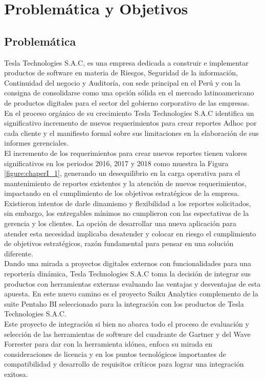 \chapter{Problemática y Objetivos} \label{chapter:I}
\section{Problem\'{a}tica}
\begin{spacing}{1.5}	
	Tesla Technologies S.A.C, es una empresa dedicada a construir e implementar productos de software en materia de Riesgos, Seguridad de la información, Continuidad del negocio y Auditoría, con sede principal en el Perú y con la consigna de consolidarse como una opci\'{o}n s\'{o}lida en el mercado latinoamericano de productos digitales para el sector del gobierno corporativo de las empresas.\\	                         
	En el proceso org\'{a}nico de su crecimiento Tesla Technologies S.A.C  identifica un significativo incremento de nuevos requerimientos para crear reportes Adhoc por cada cliente y el manifiesto formal sobre sus limitaciones en la elaboraci\'{o}n de sus informes gerenciales.\\
	El incremento de los requerimientos para crear nuevos reportes tienen valores significativos en los periodos 2016, 2017 y 2018 como muestra la Figura \ref{figure:chaperI_1}, generando un desequilibrio en la carga operativa para el mantenimiento de reportes existentes y la atenci\'{o}n de nuevos requerimientos, impactando en el cumplimiento de los objetivos estrat\'{e}gicos de la empresa.\\
	Existieron intentos de darle dinamismo y flexibilidad a los reportes solicitados, sin embargo,  los entregables m\'{i}nimos no cumplieron con las espectativas de la gerencia y los clientes. La opci\'{o}n de desarrollar una nueva aplicaci\'{o}n para atender esta necesidad implicaba desatender y colocar en riesgo el cumplimiento de objetivos estrat\'{e}gicos, raz\'{o}n fundamental para pensar en una soluci\'{o}n diferente.\\
	Dando una mirada a proyectos digitales externos con funcionalidades para una reporter\'{i}a din\'{a}mica, Tesla Technologies S.A.C toma la decisi\'{o}n de integrar sus productos con herramientas externas evaluando las ventajas y desventajas de esta apuesta. En este nuevo camino es el proyecto Saiku Analytics complemento de la suite Pentaho BI seleccionado para la integración con los productos de Tesla Technologies S.A.C.\\	
	Este proyecto de integraci\'{o}n si bien no abarca todo el proceso de evaluaci\'{o}n y selecci\'{o}n de  las herramientas de software del cuadrante de Gartner y del Wave Forrester para dar con la herramienta id\'{o}nea, enfoca su mirada en consideraciones de licencia y en los puntos tecnol\'{o}gicos importantes de compatibilidad y desarrollo de requisitos cr\'{i}ticos para lograr una integraci\'{o}n exitosa.\\
	

\end{spacing}
